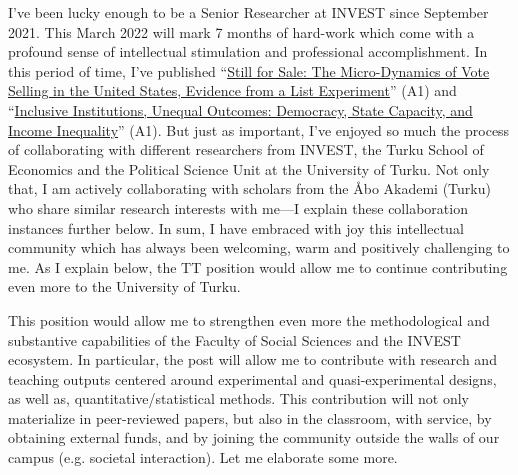 \documentclass[10pt,stdletter,dateno,sigleft]{newlfm} %
\begin{document}
\begin{newlfm}
I've been lucky enough to be a Senior Researcher at INVEST since September 2021. This March 2022 will mark 7 months of hard-work which come with a profound sense of intellectual stimulation and professional accomplishment. In this period of time, I've published ``\href{https://link.springer.com/article/10.1057/s41269-020-00174-4}{Still for Sale: The Micro-Dynamics of Vote Selling in the United States, Evidence from a List Experiment}'' (A1) and ``\href{https://www.sciencedirect.com/science/article/pii/S0176268021000471?via%3Dihub}{Inclusive Institutions, Unequal Outcomes: Democracy, State Capacity, and Income Inequality}'' (A1). But just as important, I've enjoyed so much the process of collaborating with different researchers from INVEST, the Turku School of Economics and the Political Science Unit at the University of Turku. Not only that, I am actively collaborating with scholars from the \AA bo Akademi (Turku) who share similar research interests with me---I explain these collaboration instances further below. In sum, I have embraced with joy this intellectual community which has always been welcoming, warm and positively challenging to me. As I explain below, the TT position would allow me to continue contributing even more to the University of Turku.

This position would allow me to strengthen even more the methodological and substantive capabilities of the Faculty of Social Sciences and the INVEST ecosystem. In particular, the post will allow me to contribute with research and teaching outputs centered around experimental and quasi-experimental designs, as well as, quantitative/statistical methods. This contribution will not only materialize in peer-reviewed papers, but also in the classroom, with service, by obtaining external funds, and by joining the community outside the walls of our campus (e.g. societal interaction). Let me elaborate some more. 


\end{newlfm}
\end{document}

